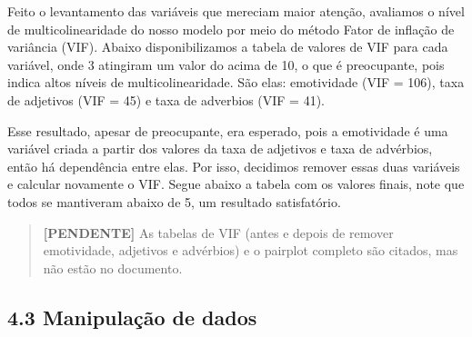 \documentclass[
  brazilian,
  11pt,
]{article}
\begin{document}
Feito o levantamento das variáveis que mereciam maior atenção, avaliamos o nível de multicolinearidade do nosso modelo por meio do método Fator de inflação de variância (VIF). Abaixo disponibilizamos a tabela de valores de VIF para cada variável, onde 3 atingiram um valor do acima de 10, o que é preocupante, pois indica altos níveis de multicolinearidade. São elas: emotividade (VIF = 106), taxa de adjetivos (VIF = 45) e taxa de adverbios (VIF = 41).

Esse resultado, apesar de preocupante, era esperado, pois a emotividade é uma variável criada a partir dos valores da taxa de adjetivos e taxa de advérbios, então há dependência entre elas. Por isso, decidimos remover essas duas variáveis e calcular novamente o VIF. Segue abaixo a tabela com os valores finais, note que todos se mantiveram abaixo de 5, um resultado satisfatório.

\begin{quote}
\textbf{{[}PENDENTE{]}} As tabelas de VIF (antes e depois de remover emotividade, adjetivos e advérbios) e o pairplot completo são citados, mas não estão no documento.
\end{quote}

\subsection{4.3 Manipulação de dados}\label{manipulauxe7uxe3o-de-dados}
\end{document}
